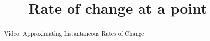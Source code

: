 \documentclass[handout]{ximera}
\title{Rate of change at a point}
\begin{document}
\begin{abstract} Video: Approximating Instantaneous Rates of Change %
\end{abstract}

\maketitle

\end{document}
